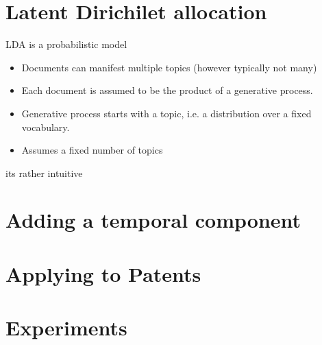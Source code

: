 


\section{Latent Dirichilet allocation}
LDA is a probabilistic model
\begin{itemize}
\item Documents can manifest multiple topics (however typically not many)
\item Each document is assumed to be the product of a generative process.
\item Generative process starts with a topic, i.e. a distribution over a fixed vocabulary.
\item Assumes a fixed number of topics
\end{itemize}
its rather intuitive

\section{Adding a temporal component}

\section{Applying to Patents}

\section{Experiments}

